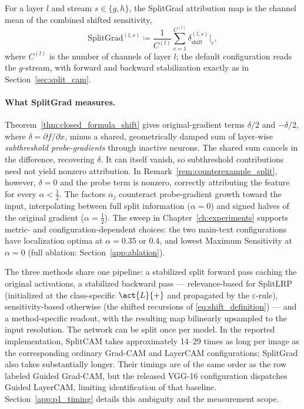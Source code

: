 \begin{definition}[SplitGrad]\label{def:splitgrad}
For a layer $l$ and stream $s \in \{g, h\}$, the SplitGrad attribution map is the channel mean of the combined shifted sensitivity,
\begin{equation}
	\text{SplitGrad}^{(l, s)} \coloneqq \frac{1}{C^{(l)}} \sum_{c = 1}^{C^{(l)}} \delta_{\mathrm{shift}}^{(l, s)}\big\vert_c,
	\label{eq:splitgrad}
\end{equation}
where $C^{(l)}$ is the number of channels of layer $l$; the default configuration reads the $g$-stream, with forward and backward stabilization exactly as in Section~\ref{sec:split_cam}.
\end{definition}

\paragraph{What SplitGrad measures.}\label{subsec:closed_formulas}
Theorem~\ref{thm:closed_formula_shift} gives original-gradient terms $\delta/2$ and $-\delta/2$, where $\delta=\partial f/\partial x$, minus a shared, geometrically damped sum of layer-wise \emph{subthreshold probe-gradients} through inactive neurons. The shared sum cancels in the difference, recovering $\delta$. It can itself vanish, so subthreshold contributions need not yield nonzero attribution. In Remark~\ref{rem:counterexample_split}, however, $\delta=0$ and the probe term is nonzero, correctly attributing the feature for every $\alpha<\tfrac12$. The factors $\overline\alpha_j$ counteract probe-gradient growth toward the input, interpolating between full split information ($\alpha=0$) and signed halves of the original gradient ($\alpha=\tfrac12$). The sweep in Chapter~\ref{ch:experiments} supports metric- and configuration-dependent choices: the two main-text configurations have localization optima at $\alpha=0.35$ or $0.4$, and lowest Maximum Sensitivity at $\alpha=0$ (full ablation: Section~\ref{app:ablation}).

The three methods share one pipeline: a stabilized split forward pass caching the original activations, a stabilized backward pass --- relevance-based for SplitLRP (initialized at the class-specific $\act{L}{+}$ and propagated by the $\varepsilon$-rule), sensitivity-based otherwise (the shifted recursions of \eqref{eq:shift_definition}) --- and a method-specific readout, with the resulting map bilinearly upsampled to the input resolution. The network can be split once per model. In the reported implementation, SplitCAM takes approximately 14--29 times as long per image as the corresponding ordinary Grad-CAM and LayerCAM configurations; SplitGrad also takes substantially longer. Their timings are of the same order as the row labeled Guided Grad-CAM, but the released VGG-16 configuration dispatches Guided LayerCAM, limiting identification of that baseline. Section~\ref{app:p1_timing} details this ambiguity and the measurement scope.


